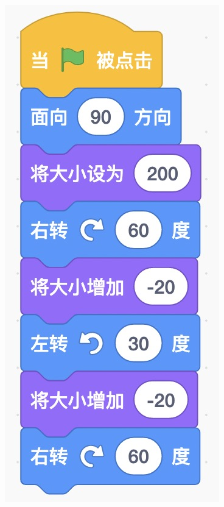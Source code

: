 \documentclass[10pt, a4paper]{article}
\begin{document}
\begin{enumerate}
\begin{figure}[htbp]
\begin{minipage}[t]{.35\textwidth}
                \begin{minipage}[t]{.25\textwidth}
                    \centering
                    \includegraphics[width=\textwidth]{14-1.jpg}

\end{minipage}
\end{minipage}
\end{figure}
\end{enumerate}
\end{document}
